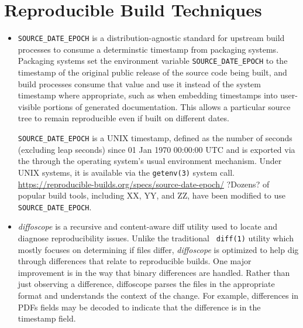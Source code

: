 \section{Reproducible Build Techniques}
\label{SEC:techniques}


\begin{itemize}

\item {\tt SOURCE\_DATE\_EPOCH} is a distribution-agnostic standard for
upstream build processes to consume a determinstic timestamp from packaging
systems.
Packaging systems set the environment variable \texttt{SOURCE\_DATE\_EPOCH} to the timestamp of the original public release of the source code being built,
and build processes consume that value and use it instead of the system timestamp where appropriate,
such as when embedding timestamps into user-visible portions of generated documentation.
This allows a particular source tree  to remain reproducible even if built on different dates.

{\tt SOURCE\_DATE\_EPOCH} is a UNIX timestamp, defined as the number of seconds
(excluding leap seconds) since 01 Jan 1970 00:00:00 UTC and is exported via
the through the operating system's usual environment mechanism. Under UNIX
systems, it is available via the {\tt getenv(3)} system call.  
\url{https://reproducible-builds.org/specs/source-date-epoch/}
?Dozens? of popular build tools, including XX, YY, and ZZ, have been 
modified to use {\tt SOURCE\_DATE\_EPOCH}.


\item {\em diffoscope} is a recursive and content-aware diff utility used
to locate and diagnose reproducibility issues. Unlike the traditional {\tt
diff(1)} utility which mostly focuses on determining if files differ, 
{\em diffoscope} is optimized to help dig through differences that relate 
to reproducible builds.  One major improvement is in the way that binary
differences are handled.  Rather than just observing a difference,
diffoscope parses the files in the appropriate format and understands the
context of the change.  For example, differences in PDFs fields may be
decoded to indicate that the difference is in the timestamp field.


\end{itemize}
